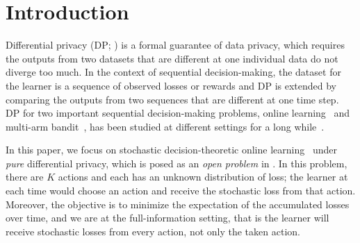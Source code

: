 \section{Introduction}
Differential privacy (DP; \citet{dwork2014algorithmic}) is a formal guarantee of data privacy, which requires the outputs from two datasets that are different at one individual data do not diverge too much.
In the context of sequential decision-making, the dataset for the learner is a sequence of observed losses or rewards and DP is extended by comparing the outputs from two sequences that are different at one time step.
DP for two important sequential decision-making problems, online learning~\citep{cesa2006prediction,arora2012multiplicative} and multi-arm bandit~\citep{lai1985asymptotically}, has been studied at different settings for a long while~\citep{jain2012differentially, guha2013nearly,jain2014near,agarwal2017price,tossou2017achieving,sajed2019optimal,hu2021near,asi2023private}.

In this paper, we focus on stochastic decision-theoretic online learning~\citep{freund1997decision} under \emph{pure} differential privacy, which is posed as an \emph{open problem} in \citet{hu2024open}.
In this problem, there are $K$ actions and each has an unknown distribution of loss; the learner at each time would choose an action and receive the stochastic loss from that action.
Moreover, the objective is to minimize the expectation of the accumulated losses over time, and we are at the full-information setting, that is the learner will receive stochastic losses from every action, not only the taken action.

